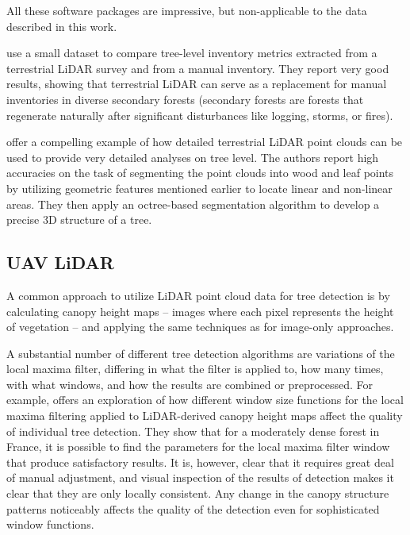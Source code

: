 All these software packages are impressive, but non-applicable to the data described in this work.

\citet{vianaTimberVolumeEstimation2022} use a small dataset to compare tree-level inventory metrics extracted from a terrestrial LiDAR survey and from a manual inventory.
They report very good results, showing that terrestrial LiDAR can serve as a replacement for manual inventories in diverse secondary forests (secondary forests are forests that regenerate naturally after significant disturbances like logging, storms, or fires).

\citet{nurunnabiDevelopmentPreciseTree2024} offer a compelling example of how detailed terrestrial LiDAR point clouds can be used to provide very detailed analyses on tree level.
The authors report high accuracies on the task of segmenting the point clouds into wood and leaf points by utilizing geometric features mentioned earlier to locate linear and non-linear areas.
They then apply an octree-based segmentation algorithm to develop a precise 3D structure of a tree.

\subsection{UAV LiDAR}

A common approach to utilize LiDAR point cloud data for tree detection is by calculating canopy height maps – images where each pixel represents the height of vegetation – and applying the same techniques as for image-only approaches.

A substantial number of different tree detection algorithms are variations of the local maxima filter, differing in what the filter is applied to, how many times, with what windows, and how the results are combined or preprocessed.
For example, \citet{doussExtractionIndividualTrees2022} offers an exploration of how different window size functions for the local maxima filtering applied to LiDAR-derived canopy height maps affect the quality of individual tree detection.
They show that for a moderately dense forest in France, it is possible to find the parameters for the local maxima filter window that produce satisfactory results.
It is, however, clear that it requires great deal of manual adjustment, and visual inspection of the results of detection makes it clear that they are only locally consistent.
Any change in the canopy structure patterns noticeably affects the quality of the detection even for sophisticated window functions.

